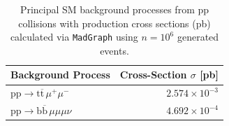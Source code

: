 \begin{table}[h!]
  \begin{tabular}{l r}
    \hline
    {Background Process} & {Cross-Section $\sigma$ [\textrm{pb}]} \\
    \hline
   $\mathrm{pp} \to \mathrm{t} \overline{\mathrm{t}} \, \mu^+ \mu^-$ & $2.574\times 10^{-3}$  \\
    $\mathrm{pp} \to \mathrm{b}\overline{\mathrm{b}}\, \mu\mu\mu\nu $ & $4.692 \times 10^{-4}$ \\
    \hline
  \end{tabular}
  \centering
  \caption{Principal SM background processes from $\mathrm{pp}$ collisions with production cross sections (pb) calculated via \texttt{MadGraph} using $n = 10^6$ generated events.}
  \label{tab:dominantbkgs}
\end{table}


